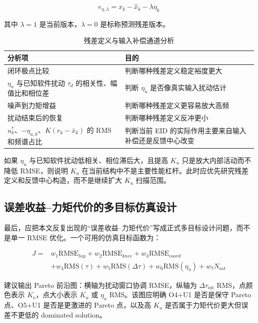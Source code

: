 \documentclass[12pt,a4paper]{ctexart}
\begin{document}
\[
e_{\eta,\lambda}=x_k-\hat{x}_k-\lambda\eta_k
\]

其中 $\lambda=1$ 是当前版本，$\lambda=0$ 是标称预测残差版本。

\begin{table}[htbp]
\centering
\footnotesize
\caption{残差定义与输入补偿通道分析}
\begin{tabularx}{\textwidth}{YY}
\toprule
分析项 & 目的 \\
\midrule
闭环极点比较 & 判断哪种残差定义稳定裕度更大 \\
$\eta_u$ 与已知软件扰动 $\tau_d$ 的相关性、幅值比和相位差 & 判断 $\eta_u$ 是否像真实输入扰动估计 \\
噪声到力矩增益 & 判断哪种残差定义更容易放大高频 \\
扰动结束后的恢复 & 判断哪种残差定义反冲更小 \\
$u_k^*$、$-\eta_{u,k}$、$K(r_k-\bar{x}_k)$ 的 RMS 和频谱占比 & 判断当前 EID 的实际作用主要来自输入补偿还是反馈中心改变 \\
\bottomrule
\end{tabularx}
\end{table}

如果 $\eta_u$ 与已知软件扰动低相关、相位滞后大，且提高 $K_u$ 只是放大内部活动而不降低 RMSE，则说明 $K_u$ 在当前结构中不是主要性能杠杆。此时应优先研究残差定义和反馈中心构造，而不是继续扩大 $K_u$ 扫描范围。

\subsection{误差收益--力矩代价的多目标仿真设计}

最后，应把本文反复出现的“误差收益--力矩代价”写成正式多目标设计问题，而不是单一 RMSE 优化。一个可用的仿真目标函数为：

\[
\begin{aligned}
J=&
w_1 \mathrm{RMSE}_{hip}
+w_2 \mathrm{RMSE}_{knee}
+w_3 \mathrm{RMSE}_{coord}\\
&+w_4 \mathrm{RMS}(\tau)
+w_5 \mathrm{RMS}(\Delta \tau)
+w_6 \mathrm{RMS}(\eta_u)
+w_7 N_{\mathrm{sat}}
\end{aligned}
\]

建议输出 Pareto 前沿图：横轴为扰动窗口协调 RMSE，纵轴为 $\Delta\tau_\mathrm{est}$ RMS，点颜色表示 $K_o$，点大小表示 $K_u$ 或 $\eta_u$ RMS。该图应明确 O4+U1 是否是保守 Pareto 点、O5+U1 是否是更激进的 Pareto 点，以及高 $K_u$ 是否属于力矩代价更大但误差不更低的 dominated solution。
\end{document}
